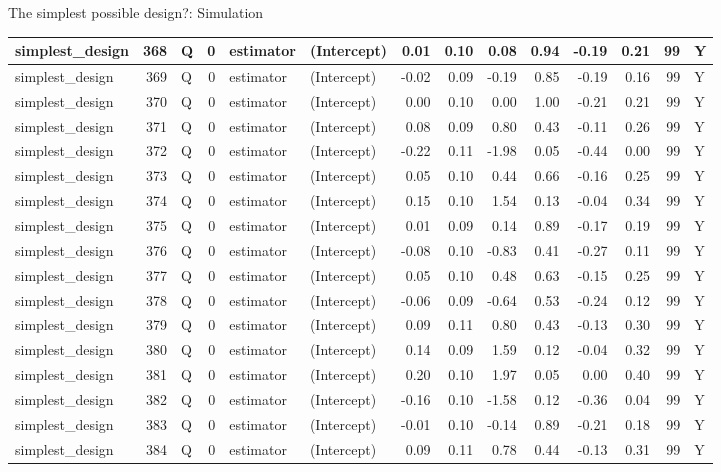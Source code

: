 \documentclass[
  11pt,
  ignorenonframetext,
]{beamer}
\begin{document}
\begin{frame}[fragile]{The simplest possible design?: Simulation}
\begin{tabular}{l|r|l|r|l|l|r|r|r|r|r|r|r|l}
\hline
simplest\_design & 368 & Q & 0 & estimator & (Intercept) & 0.01 & 0.10 & 0.08 & 0.94 & -0.19 & 0.21 & 99 & Y\\
\hline
simplest\_design & 369 & Q & 0 & estimator & (Intercept) & -0.02 & 0.09 & -0.19 & 0.85 & -0.19 & 0.16 & 99 & Y\\
\hline
simplest\_design & 370 & Q & 0 & estimator & (Intercept) & 0.00 & 0.10 & 0.00 & 1.00 & -0.21 & 0.21 & 99 & Y\\
\hline
simplest\_design & 371 & Q & 0 & estimator & (Intercept) & 0.08 & 0.09 & 0.80 & 0.43 & -0.11 & 0.26 & 99 & Y\\
\hline
simplest\_design & 372 & Q & 0 & estimator & (Intercept) & -0.22 & 0.11 & -1.98 & 0.05 & -0.44 & 0.00 & 99 & Y\\
\hline
simplest\_design & 373 & Q & 0 & estimator & (Intercept) & 0.05 & 0.10 & 0.44 & 0.66 & -0.16 & 0.25 & 99 & Y\\
\hline
simplest\_design & 374 & Q & 0 & estimator & (Intercept) & 0.15 & 0.10 & 1.54 & 0.13 & -0.04 & 0.34 & 99 & Y\\
\hline
simplest\_design & 375 & Q & 0 & estimator & (Intercept) & 0.01 & 0.09 & 0.14 & 0.89 & -0.17 & 0.19 & 99 & Y\\
\hline
simplest\_design & 376 & Q & 0 & estimator & (Intercept) & -0.08 & 0.10 & -0.83 & 0.41 & -0.27 & 0.11 & 99 & Y\\
\hline
simplest\_design & 377 & Q & 0 & estimator & (Intercept) & 0.05 & 0.10 & 0.48 & 0.63 & -0.15 & 0.25 & 99 & Y\\
\hline
simplest\_design & 378 & Q & 0 & estimator & (Intercept) & -0.06 & 0.09 & -0.64 & 0.53 & -0.24 & 0.12 & 99 & Y\\
\hline
simplest\_design & 379 & Q & 0 & estimator & (Intercept) & 0.09 & 0.11 & 0.80 & 0.43 & -0.13 & 0.30 & 99 & Y\\
\hline
simplest\_design & 380 & Q & 0 & estimator & (Intercept) & 0.14 & 0.09 & 1.59 & 0.12 & -0.04 & 0.32 & 99 & Y\\
\hline
simplest\_design & 381 & Q & 0 & estimator & (Intercept) & 0.20 & 0.10 & 1.97 & 0.05 & 0.00 & 0.40 & 99 & Y\\
\hline
simplest\_design & 382 & Q & 0 & estimator & (Intercept) & -0.16 & 0.10 & -1.58 & 0.12 & -0.36 & 0.04 & 99 & Y\\
\hline
simplest\_design & 383 & Q & 0 & estimator & (Intercept) & -0.01 & 0.10 & -0.14 & 0.89 & -0.21 & 0.18 & 99 & Y\\
\hline
simplest\_design & 384 & Q & 0 & estimator & (Intercept) & 0.09 & 0.11 & 0.78 & 0.44 & -0.13 & 0.31 & 99 & Y\\

\end{tabular}
\end{frame}
\end{document}
